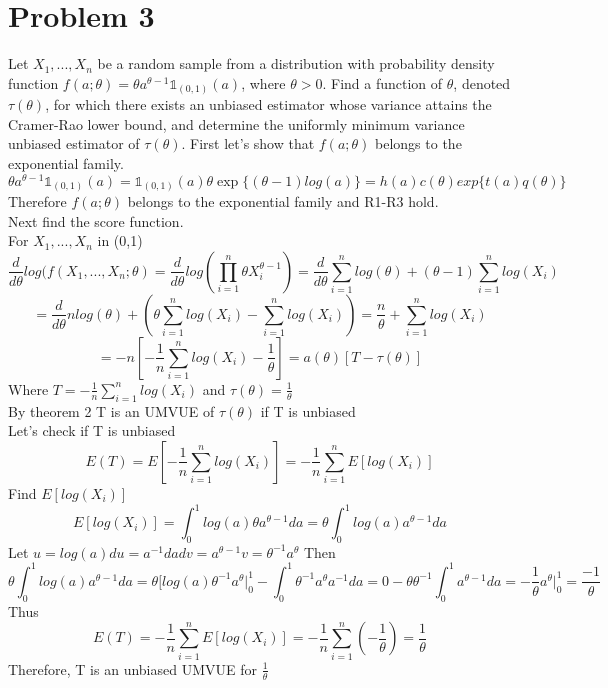 \documentclass[a4paper]{article}
\begin{document}
\section*{Problem 3}
Let $X_1, . . . , X_n$ be a random sample from a distribution with probability density function
$f(a; \theta) = \theta a ^{\theta-1}\mathds{1}_{(0,1)}(a)$,
where $\theta > 0$. Find a function of $\theta$, denoted $\tau(\theta)$, for which there exists an unbiased estimator whose variance attains the Cramer-Rao lower bound, and determine the uniformly minimum variance unbiased estimator of $\tau(\theta)$.
First let's show that $f(a; \theta)$ belongs to the exponential family.
\[
\theta a ^{\theta-1}\mathds{1}_{(0,1)}(a)
= \mathds{1}_{(0,1)}(a) \theta \exp\{(\theta-1)log(a)\}
= h(a)c(\theta)exp\{t(a)q(\theta)\}
\]
Therefore $f(a; \theta)$ belongs to the exponential family and R1-R3 hold.
\\Next find the score function.
\\For $X_1, . . . , X_n$ in (0,1)
\[
\frac{d}{d\theta} log(f(X_1,..., X_n; \theta) 
= \frac{d}{d\theta} log(\prod_{i=1}^{n}\theta X_{i} ^{\theta−1})
= \frac{d}{d\theta} \sum_{i=1}^{n}log(\theta)+ (\theta-1)\sum_{i=1}^{n}log(X_{i})\]\[
= \frac{d}{d\theta} nlog(\theta)+ (\theta\sum_{i=1}^{n}log(X_{i})-\sum_{i=1}^{n}log(X_{i}))
= \frac{n}{\theta} + \sum_{i=1}^{n}log(X_{i})
\]\[
= -n[-\frac{1}{n}\sum_{i=1}^{n}log(X_{i}) - \frac{1}{\theta}]
= a(\theta)[T - \tau(\theta)]
\]
Where $T = -\frac{1}{n}\sum_{i=1}^{n}log(X_{i})$ and $\tau(\theta) = \frac{1}{\theta}$
\\By theorem 2 T is an UMVUE of $\tau(\theta)$ if T is unbiased\\
Let's check if T is unbiased
\[
E(T) = E[-\frac{1}{n}\sum_{i=1}^{n}log(X_{i})] = -\frac{1}{n}\sum_{i=1}^{n}E[log(X_{i})]
\]
Find $E[log(X_{i})]$
\[
E[log(X_{i})] = \int_{0}^{1}log(a)\theta a ^{\theta-1}da
= \theta\int_{0}^{1}log(a)a^{\theta-1}da
\]
Let $u = log(a) du=a^{-1}da dv = a^{\theta-1} v = \theta^{-1}a^{\theta}$
Then
\[
\theta\int_{0}^{1}log(a)a^{\theta-1} da
= \theta[log(a)\theta^{-1}a^{\theta}\biggr\rvert_{0}^{1} - \int_{0}^{1}\theta^{-1}a^{\theta}a^{-1}da
= 0 - \theta\theta^{-1}\int_{0}^{1}a^{\theta-1}da
= -\frac{1}{\theta}a^{\theta}\biggr\rvert_{0}^{1} = \frac{-1}{\theta}
\]
Thus
\[
E(T) =-\frac{1}{n}\sum_{i=1}^{n}E[log(X_{i})]
= -\frac{1}{n}\sum_{i=1}^{n}(-\frac{1}{\theta})
=\frac{1}{\theta}
\]
Therefore, T is an unbiased UMVUE for $\frac{1}{\theta}$
\end{document}
